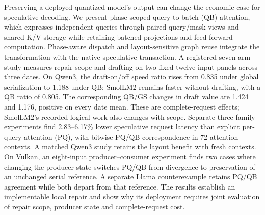Preserving a deployed quantized model's output can change the economic case for speculative decoding. We present phase-scoped query-to-batch (QB) attention, which expresses independent queries through paired query/mask views and shared K/V storage while retaining batched projections and feed-forward computation. Phase-aware dispatch and layout-sensitive graph reuse integrate the transformation with the native speculative transaction. A registered seven-arm study measures repair scope and drafting on two fixed twelve-input panels across three dates. On Qwen3, the draft-on/off speed ratio rises from 0.835 under global serialization to 1.188 under QB; SmolLM2 remains faster without drafting, with a QB ratio of 0.805. The corresponding QB/GS changes in draft value are 1.424 and 1.176, positive on every date mean. These are complete-request effects; SmolLM2's recorded logical work also changes with scope. Separate three-family experiments find 2.83--6.17\% lower speculative request latency than explicit per-query attention (PQ), with bitwise PQ/QB correspondence in 72 attention contexts. A matched Qwen3 study retains the layout benefit with fresh contexts. On Vulkan, an eight-input producer--consumer experiment finds two cases where changing the producer state switches PQ/QB from divergence to preservation of an unchanged serial reference. A separate Llama counterexample retains PQ/QB agreement while both depart from that reference. The results establish an implementable local repair and show why its deployment requires joint evaluation of repair scope, producer state and complete-request cost.
